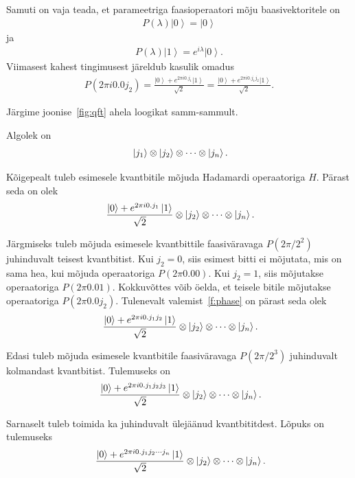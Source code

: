 \documentclass[12pt]{report}
\def\ket#1{\left|#1\right>}
\begin{document}
Samuti on vaja teada, et parameetriga faasioperaatori mõju baasivektoritele on
\begin{align}
    P(\lambda)\ket{0} = \ket{0}
\end{align}
ja
\begin{align}
    P(\lambda)\ket{1} = e^{i\lambda}\ket{0} .
\end{align}
Viimasest kahest tingimusest järeldub kasulik omadus
\begin{align}\label{f:phase}
    P(2\pi i0.0j_2) = \frac{\ket{0} + e^{2\pi i 0.j_1} \ket{1}}{\sqrt{2}}
    = \frac{\ket{0}+e^{2\pi i0.j_1j_2}\ket{1}}{\sqrt{2}} .
\end{align}

Järgime joonise~\ref{fig:qft} ahela loogikat samm-sammult.

Algolek on
\begin{align}
    \ket{j_1} \otimes \ket{j_2} \otimes \cdots \otimes \ket{j_n} \rlap{.}
\end{align}

Kõigepealt tuleb esimesele kvantbitile mõjuda Hadamardi operaatoriga \(H\).
Pärast seda on olek
\begin{align}
    \frac{\ket{0} + e^{2\pi i0.j_1}\ket{1}}{\sqrt{2}} \otimes \ket{j_2} \otimes \cdots \otimes \ket{j_n} \rlap{.}
\end{align}

Järgmiseks tuleb mõjuda esimesele kvantbittile faasiväravaga \(P(2\pi/2^2)\) juhinduvalt teisest kvantbitist.
Kui \(j_2 = 0\), siis esimest bitti ei mõjutata, mis on sama hea, kui mõjuda operaatoriga \(P(2\pi 0.00)\).
Kui \(j_2 = 1\), siis mõjutakse operaatoriga \(P(2\pi 0.01)\).
Kokkuvõttes võib öelda, et teisele bitile mõjutakse operaatoriga \(P(2\pi 0.0j_2)\).
Tulenevalt valemist~\ref{f:phase} on pärast seda olek
\begin{align}
    \frac{\ket{0} + e^{2\pi i0.j_1j_2}\ket{1}}{\sqrt{2}} \otimes \ket{j_2} \otimes \cdots \otimes \ket{j_n} \rlap{.}
\end{align}

Edasi tuleb mõjuda esimesele kvantbitile faasiväravaga \(P(2\pi/2^3)\) juhinduvalt kolmandast kvantbitist.
Tulemuseks on
\begin{align}
    \frac{\ket{0} + e^{2\pi i0.j_1j_2j_3}\ket{1}}{\sqrt{2}} \otimes \ket{j_2} \otimes \cdots \otimes \ket{j_n} \rlap{.}
\end{align}

Sarnaselt tuleb toimida ka juhinduvalt ülejäänud kvantbititdest.
Lõpuks on tulemuseks
\begin{align}
    \frac{\ket{0} + e^{2\pi i0.j_1j_2\cdots j_n}\ket{1}}{\sqrt{2}} \otimes \ket{j_2} \otimes \cdots \otimes \ket{j_n} \rlap{.}
\end{align}
\end{document}
